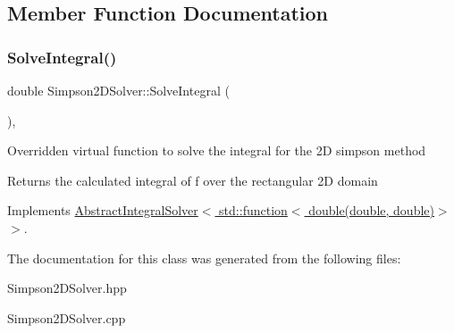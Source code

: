 \subsection{Member Function Documentation}
\mbox{\label{class_simpson2_d_solver_a3fc19037fef83ad05381138d9f7da939}} 
\subsubsection{\texorpdfstring{Solve\+Integral()}{SolveIntegral()}}
{\footnotesize\ttfamily double Simpson2\+D\+Solver\+::\+Solve\+Integral (\begin{DoxyParamCaption}{ }\end{DoxyParamCaption})\hspace{0.3cm}{\ttfamily [override]}, {\ttfamily [virtual]}}

Overridden virtual function to solve the integral for the 2D simpson method \begin{DoxyReturn}{Returns}
the calculated integral of f over the rectangular 2D domain 
\end{DoxyReturn}


Implements \hyperlink{class_abstract_integral_solver_ad87cb44c5ef3122bc95be48f473ba399}{Abstract\+Integral\+Solver$<$ std\+::function$<$ double(double, double)$>$ $>$}.



The documentation for this class was generated from the following files\+:\begin{DoxyCompactItemize}
\item 
Simpson2\+D\+Solver.\+hpp\item 
Simpson2\+D\+Solver.\+cpp\end{DoxyCompactItemize}
